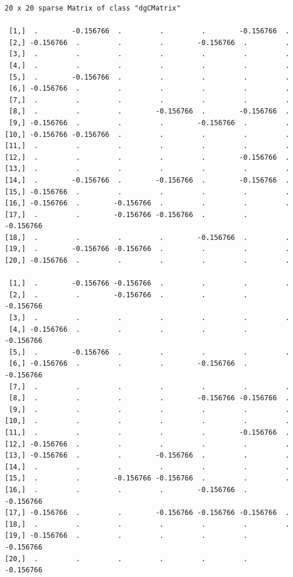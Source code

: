 \documentclass[11pt]{article}
\begin{document}
\begin{enumerate}
\begin{verbatim}
20 x 20 sparse Matrix of class "dgCMatrix"

 [1,]  .        -0.156766  .         .         .        -0.156766  .
 [2,] -0.156766  .         .         .        -0.156766  .         .
 [3,]  .         .         .         .         .         .         .
 [4,]  .         .         .         .         .         .         .
 [5,]  .        -0.156766  .         .         .         .         .
 [6,] -0.156766  .         .         .         .         .         .
 [7,]  .         .         .         .         .         .         .
 [8,]  .         .         .        -0.156766  .        -0.156766  .
 [9,] -0.156766  .         .         .        -0.156766  .         .
[10,] -0.156766 -0.156766  .         .         .         .         .
[11,]  .         .         .         .         .         .         .
[12,]  .         .         .         .         .        -0.156766  .
[13,]  .         .         .         .         .         .         .
[14,]  .        -0.156766  .        -0.156766  .        -0.156766  .
[15,] -0.156766  .         .         .         .         .         .
[16,] -0.156766  .        -0.156766  .         .         .         .
[17,]  .         .        -0.156766 -0.156766  .         .        -0.156766
[18,]  .         .         .         .        -0.156766  .         .
[19,]  .        -0.156766 -0.156766  .         .         .         .
[20,] -0.156766  .         .         .         .         .         .

 [1,]  .        -0.156766 -0.156766  .         .         .         .
 [2,]  .         .        -0.156766  .         .         .        -0.156766
 [3,]  .         .         .         .         .         .         .
 [4,] -0.156766  .         .         .         .         .        -0.156766
 [5,]  .        -0.156766  .         .         .         .         .
 [6,] -0.156766  .         .         .        -0.156766  .        -0.156766
 [7,]  .         .         .         .         .         .         .
 [8,]  .         .         .         .        -0.156766 -0.156766  .
 [9,]  .         .         .         .         .         .         .
[10,]  .         .         .         .         .         .         .
[11,]  .         .         .         .         .        -0.156766  .
[12,] -0.156766  .         .         .         .         .         .
[13,] -0.156766  .         .        -0.156766  .         .         .
[14,]  .         .         .         .         .         .         .
[15,]  .         .        -0.156766 -0.156766  .         .         .
[16,]  .         .         .         .        -0.156766  .        -0.156766
[17,] -0.156766  .         .        -0.156766 -0.156766 -0.156766  .
[18,]  .         .         .         .         .         .         .
[19,] -0.156766  .         .         .         .         .        -0.156766
[20,]  .         .         .         .         .         .        -0.156766


\end{verbatim}
\end{enumerate}
\end{document}
